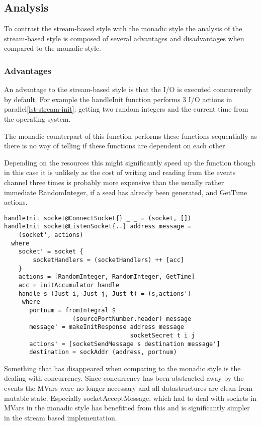 \subsection{Analysis}
To contrast the stream-based style with the monadic style the analysis of the stream-based style is composed of several advantages and disadvantages when compared to the monadic style.

\subsubsection{Advantages}
An advantage to the stream-based style is that the I/O is executed concurrently by default. For example the handleInit function performs 3 I/O actions in parallel\ref{lst-stream-init}: getting two random integers and the current time from the operating system. 

The monadic counterpart of this function performs these functions sequentially as there is no way of telling if these functions are dependent on each other.

Depending on the resources this might significantly speed up the function though in this case it is unlikely as the cost of writing and reading from the events channel three times is probably more expensive than the usually rather immediate RandomInteger, if a seed has already been generated, and GetTime actions. 

\begin{lstlisting}[caption={The init handler}, label={lst-stream-init}]
handleInit socket@ConnectSocket{} _ _ = (socket, [])
handleInit socket@ListenSocket{..} address message =
    (socket', actions)
  where
    socket' = socket { 
        socketHandlers = (socketHandlers) ++ [acc]
    }
    actions = [RandomInteger, RandomInteger, GetTime]
    acc = initAccumulator handle
    handle s (Just i, Just j, Just t) = (s,actions')
     where
       portnum = fromIntegral $
                   (sourcePortNumber.header) message
       message' = makeInitResponse address message
                                   socketSecret t i j
       actions' = [socketSendMessage s destination message']
       destination = sockAddr (address, portnum)
\end{lstlisting}

Something that has disappeared when comparing to the monadic style is the dealing with concurrency. Since concurrency has been abstracted away by the events the MVars were no longer necessary and all datastructures are clean from mutable state.
Especially socketAcceptMessage, which had to deal with sockets in MVars in the monadic style has benefitted from this and is significantly simpler in the stream based implementation.

